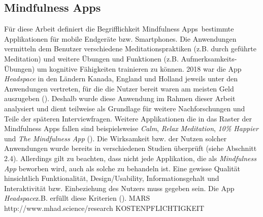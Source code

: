 \documentclass[10pt]{article}
\newcommand{\zit}[1]{(\cite{#1})}
\begin{document}
\subsection{Mindfulness Apps}
Für diese Arbeit definiert die Begrifflichkeit  \grqq Mindfulness Apps\grqq\ bestimmte Applikationen für mobile Endgeräte bzw. Smartphones. Die Anwendungen vermitteln dem Benutzer verschiedene Meditationspraktiken (z.B. durch geführte Meditation) und weitere Übungen und Funktionen (z.B. Aufmerksamkeits-Übungen) um kognitive Fähigkeiten trainieren zu können. 2018 war die App \textit{Headspace} in den Ländern Kanada, England und Holland jeweils unter den Anwendungen vertreten, für die die Nutzer bereit waren am meisten Geld auszugeben \zit{SteigendeNutzung}. Deshalb wurde diese Anwendung im Rahmen dieser Arbeit analysiert und dient teilweise als Grundlage für weitere Nachforschungen und Teile der späteren Interviewfragen. 
Weitere Applikationen die in das Raster der Mindfulness Apps fallen sind beispielsweise \textit{Calm}, \textit{Relax} \textit{Meditation}, \textit{10\% Happier} und\textit{ The Mindfulness App }\zit{VergleichApps}. Die Wirksamkeit bzw. der Nutzen solcher Anwendungen wurde bereits in verschiedenen Studien überprüft (siehe Abschnitt 2.4). Allerdings gilt zu beachten, dass nicht jede Applikation, die als \textit{Mindfulness App} beworben wird, auch als solche zu behandeln ist. Eine gewisse Qualität hinsichtlich Funktionalität, Design/Usability, Informationsgehalt und Interaktivität bzw. Einbeziehung des Nutzers muss gegeben sein. Die App \textit{Headspace}z.B. erfüllt diese Kriterien \zit{KriterienApp}. MARS http://www.mhad.science/research  KOSTENPFLICHTIGKEIT
\end{document}
